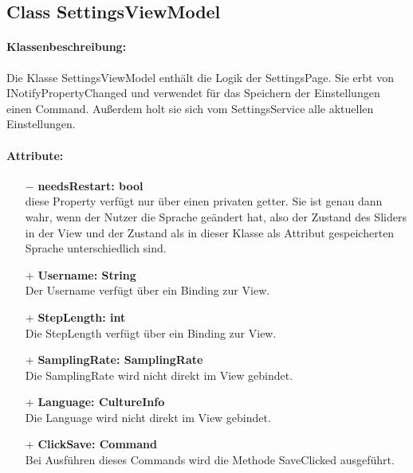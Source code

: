 \documentclass[a4paper,12pt]{article}
\begin{document}
\subsection{Class SettingsViewModel}

\paragraph{Klassenbeschreibung:}
Die Klasse SettingsViewModel enthält die Logik der SettingsPage. Sie erbt von INotifyPropertyChanged und verwendet für das Speichern der Einstellungen einen Command. Außerdem holt sie sich vom SettingsService alle aktuellen Einstellungen.
\paragraph{Attribute:}
\begin{itemize}
	\item[$-$] \textbf{needsRestart: bool}\\ diese Property verfügt nur über einen privaten getter. Sie ist genau dann wahr, wenn der Nutzer die Sprache geändert hat, also der Zustand des Sliders in der View und der Zustand als in dieser Klasse als Attribut gespeicherten Sprache unterschiedlich sind.
	\item[+] \textbf{Username: String}\\Der Username verfügt über ein Binding zur View.
	\item[+] \textbf{StepLength: int}\\Die StepLength verfügt über ein Binding zur View. 
	\item[+] \textbf{SamplingRate: SamplingRate}\\Die SamplingRate wird nicht direkt im View gebindet.
	\item[+] \textbf{Language: CultureInfo}\\Die Language wird nicht direkt im View gebindet. 
	\item[+] \textbf{ClickSave: Command}\\Bei Ausführen dieses Commands wird die Methode SaveClicked ausgeführt. 
\end{itemize}
\end{document}
